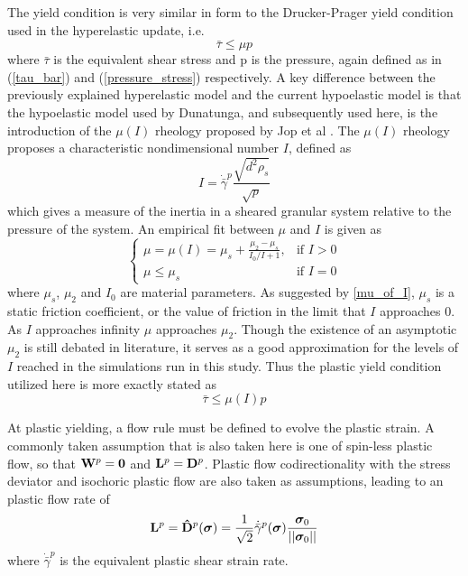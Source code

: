 The yield condition is very similar in form to the  Drucker-Prager yield condition used in the hyperelastic update, i.e.
\begin{equation}
\bar{\tau} \leq \mu p \label{yield_condition}
\end{equation}
where $\bar{\tau}$ is the equivalent shear stress and p is the pressure, again defined as in (\ref{tau_bar}) and (\ref{pressure_stress}) respectively.
A key difference between the previously explained hyperelastic model and the current hypoelastic model is that the hypoelastic model used by Dunatunga, and subsequently used here, is the introduction of the $\mu(I)$ rheology proposed by Jop et al \cite{Jop:2006:Constitutive}. The $\mu(I)$ rheology proposes a characteristic nondimensional number $I$, defined as
\begin{equation}
I=\dot{\bar{\gamma}}^p\frac{\sqrt{d^2\rho_s}}{\sqrt{p}} \label{inertial_number}
\end{equation}
which gives a measure of the inertia in a sheared granular system relative to the pressure of the system. An empirical fit between $\mu$ and $I$ is given as
\begin{equation}
\begin{cases}
	\mu=\mu(I)=\mu_s+\frac{\mu_2-\mu_s}{I_0/I+1}, & \text{if } I>0 \\
	\mu\leq \mu_s								 & \text{if } I=0
\end{cases}
\label{mu_of_I}
\end{equation}
where $\mu_s$, $\mu_2$ and $I_0$ are material parameters. As suggested by \ref{mu_of_I}, $\mu_s$ is a static friction coefficient, or the value of friction in the limit that $I$ approaches 0. As $I$ approaches infinity $\mu$ approaches $\mu_2$. Though the existence of an asymptotic $\mu_2$ is still debated in literature, it serves as a good approximation for the levels of $I$ reached in the simulations run in this study. Thus the plastic yield condition utilized here is more exactly stated as
\begin{equation}
\bar{\tau} \leq \mu(I) p \label{yield_condition_mu_of_I}
\end{equation}

At plastic yielding, a flow rule must be defined to evolve the plastic strain. A commonly taken assumption that is also taken here is one of spin-less plastic flow, so that $\bold{W}^p=\bold{0}$ and $\bold{L}^p=\bold{D}^p$. Plastic flow codirectionality with the stress deviator and isochoric plastic flow are also taken as assumptions, leading to an plastic flow rate of
\begin{equation}
\bold{L}^p=\bold{\hat{D}}^p(\bm{\sigma})=\frac{1}{\sqrt{2}}\dot{\bar{\gamma}}^p(\bm{\sigma})\frac{\bm{\sigma}_0}{||\bm{\sigma}_0||}\label{flow_rule}
\end{equation}
where $\dot{\bar{\gamma}}^p$ is the equivalent plastic shear strain rate.

